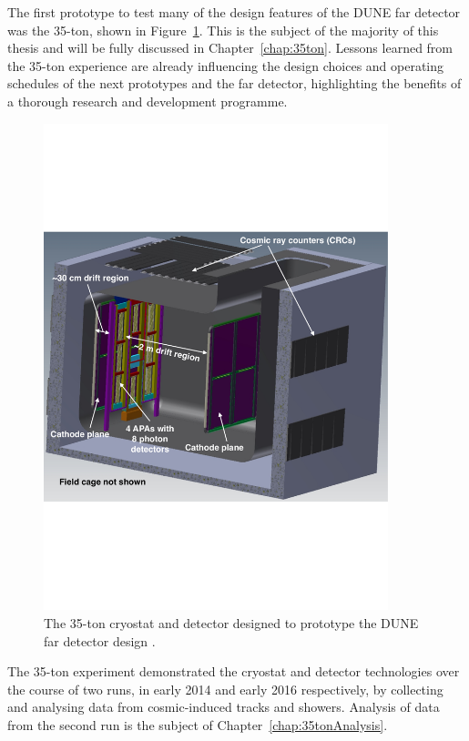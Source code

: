 The first prototype to test many of the design features of the DUNE far detector was the 35-ton, shown in Figure~\ref{fig:DUNE35ton}.  This is the subject of the majority of this thesis and will be fully discussed in Chapter~\ref{chap:35ton}.  Lessons learned from the 35-ton experience are already influencing the design choices and operating schedules of the next prototypes and the far detector, highlighting the benefits of a thorough research and development programme.

\begin{figure}
  \centering
  \includegraphics[width=10cm]{35ton.pdf}
  \caption[The 35-ton cryostat and detector designed to prototype the DUNE far detector design.]{The 35-ton cryostat and detector designed to prototype the DUNE far detector design \cite{35tonPhaseINeutrino2014}.}
  \label{fig:DUNE35ton}
\end{figure}

The 35-ton experiment demonstrated the cryostat and detector technologies over the course of two runs, in early 2014 and early 2016 respectively, by collecting and analysing data from cosmic-induced tracks and showers.  Analysis of data from the second run is the subject of Chapter~\ref{chap:35tonAnalysis}.


